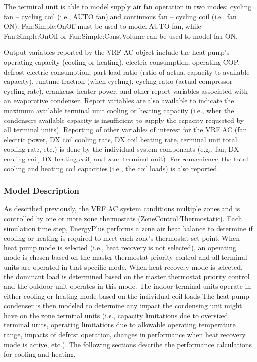 The terminal unit is able to model supply air fan operation in two modes: cycling fan -- cycling coil (i.e., AUTO fan) and continuous fan -- cycling coil (i.e., fan ON). Fan:Simple:OnOff must be used to model AUTO fan, while Fan:Simple:OnOff or Fan:Simple:ConstVolume can be used to model fan ON.

Output variables reported by the VRF AC object include the heat pump's operating capacity (cooling or heating), electric consumption, operating COP, defrost electric consumption, part-load ratio (ratio of actual capacity to available capacity), runtime fraction (when cycling), cycling ratio (actual compressor cycling rate), crankcase heater power, and other report variables associated with an evaporative condenser. Report variables are also available to indicate the maximum available terminal unit cooling or heating capacity (i.e., when the condensers available capacity is insufficient to supply the capacity requested by all terminal units). Reporting of other variables of interest for the VRF AC (fan electric power, DX coil cooling rate, DX coil heating rate, terminal unit total cooling rate, etc.) is done by the individual system components (e.g., fan, DX cooling coil, DX heating coil, and zone terminal unit). For convenience, the total cooling and heating coil capacities (i.e., the coil loads) is also reported.

\subsubsection{Model Description}\label{model-description-015}

As described previously, the VRF AC system conditions multiple zones and is controlled by one or more zone thermostats (ZoneControl:Thermostatic). Each simulation time step, EnergyPlus performs a zone air heat balance to determine if cooling or heating is required to meet each zone's thermostat set point. When heat pump mode is selected (i.e., heat recovery is not selected), an operating mode is chosen based on the master thermostat priority control and all terminal units are operated in that specific mode. When heat recovery mode is selected, the dominant load is determined based on the master thermostat priority control and the outdoor unit operates in this mode. The indoor terminal units operate in either cooling or heating mode based on the individual coil loads The heat pump condenser is then modeled to determine any impact the condensing unit might have on the zone terminal units (i.e., capacity limitations due to oversized terminal units, operating limitations due to allowable operating temperature range, impacts of defrost operation, changes in performance when heat recovery mode is active, etc.). The following sections describe the performance calculations for cooling and heating.

